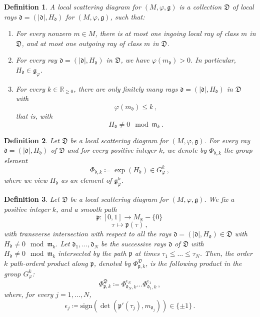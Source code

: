 \documentclass[12pt, a4paper]{amsart}
\newtheorem{defn}{Definition}[section]
\newcommand\R{\mathbb R}
\newcommand\fd{\mathfrak d}
\newcommand\fD{\mathfrak D}
\newcommand\fg{\mathfrak g}
\newcommand\fm{\mathfrak m}
\newcommand\fp{\mathfrak p}
\begin{document}
\begin{defn} \label{def_local_scattering}
A \emph{local scattering diagram} for 
$(M, \varphi,\fg)$ is a collection $\fD$ of local rays $\fd=(|\fd|, H_\fd)$ for
$(M,\varphi,\fg)$, such that:
\begin{enumerate}
	\item[(i)] For every nonzero $m \in M$, there is at most one ingoing local ray of class $m$ in $\fD$, and at most one outgoing ray of class $m$ in $\fD$.
    \item[(ii)] For every ray $\fd=(|\fd|, H_\fd)$ in $\fD$, we have
    $\varphi(m_\fd) > 0$. In particular, $H_\fd \in \fg_{\varphi}$.
    \item[(iii)] For every $k \in \R_{\geqslant 0}$, there are only finitely many rays 
$\fd=(|\fd|, H_\fd)$ in $\fD$ with 
\[\varphi(m_\fd) \leqslant k\,,\] 
that is, with
\[H_\fd \neq 0 \mod \fm_k\,.\]
\end{enumerate}
\end{defn}

\begin{defn} \label{def_autom}
Let $\fD$ be a local scattering diagram
for $(M, \varphi,\fg)$. For every ray
$\fd=(|\fd|,H_\fd)$ of $\fD$ and for every positive integer $k$, we denote by $\Phi_{\fd,k}$ the group element
\[\Phi_{\fd,k} \coloneqq \exp(H_\fd) \in G_{\varphi}^k   \,,\]
where we view $H_\fd$ as an element of $\fg_{\varphi}^k$.
\end{defn}



\begin{defn}
Let $\fD$ be a local scattering diagram
for $(M, \varphi,\fg)$. We fix a positive integer $k$, and a smooth path 
\[\fp \colon [0,1] \longrightarrow M_\R - \{0\}\,\]
\[\tau \longmapsto \fp(\tau)\,,\]
with transverse intersection with respect to all the rays $\fd=(|\fd|,H_\fd)\in \fD$
with $H_{\fd} \neq 0 \mod \fm_k$. Let $\fd_1, \dots, \fd_N$ be the successive rays $\fd$ of $\fD$ with $H_\fd \neq 0 \mod \fm_k$ intersected by the path 
$\fp$ at times $\tau_1 \leqslant \dots \leqslant \tau_N$.
Then, 
the \emph{order $k$ path-orderd product along $\fp$}, denoted by $\Phi_{\fp,k}^{\fD}$, is the following product in the group $G_\varphi^k$:
\[\Phi_{\fp,k}^{\fD} \coloneqq \Phi_{\fd_N,k}^{\epsilon_N} \dots \Phi_{\fd_1,k}^{\epsilon_1}\,,\]
where, for every $j=1, \dots, N$,
\[ \epsilon_j \coloneq \mathrm{sign} (\det (\fp'(\tau_j),m_{\fd_j}))\in \{\pm 1\} \,.\]
\end{defn}
\end{document}
